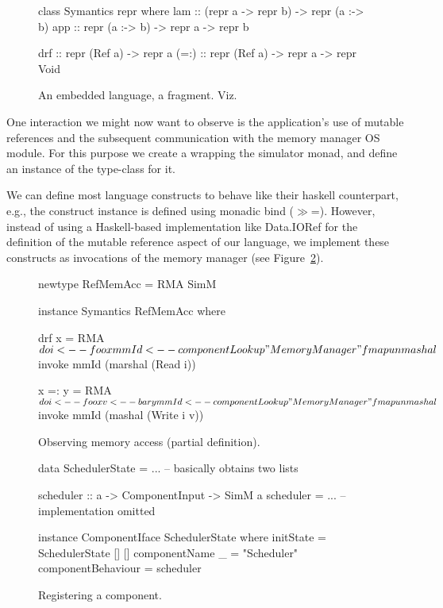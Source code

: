 \begin{figure}
\centering
\begin{code}
class Symantics repr where
  lam   :: (repr a -> repr b) -> repr (a :-> b)
  app   :: repr (a :-> b) -> repr a -> repr b

  drf   :: repr (Ref a) -> repr a
  (=:)  :: repr (Ref a) -> repr a -> repr Void
\end{code}
\caption{An embedded language, a fragment. Viz.~\cite{final_tagless_embedding}}
\label{fig:embedded_language_interface}
\end{figure}

One interaction we might now want to observe is the application's use of mutable references and the subsequent communication with the memory manager OS module.
For this purpose we create a  wrapping the simulator monad, and define an instance of the  type-class for it.

We can define most language constructs to behave like their haskell counterpart, e.g., the  construct instance is defined using monadic bind (\textsf{$\gg$=}).
However, instead of using a Haskell-based implementation like \textsf{Data.IORef} for the definition of the mutable reference aspect of our language, we implement these constructs as invocations of the memory manager (see Figure~\ref{lst_observing_memory_access}).

\begin{figure}
\centering
\begin{code}
newtype RefMemAcc =  RMA SimM

instance Symantics RefMemAcc where

  drf x = RMA $ do
    i     <-- foo x
    mmId  <-- componentLookup "MemoryManager"
    fmap unmashal $ invoke mmId (marshal (Read i))

  x =: y = RMA $ do
    i     <-- foo x
    v     <-- bar y
    mmId  <-- componentLookup "MemoryManager"
    fmap unmashal $ invoke mmId (mashal (Write i v))
\end{code}
\caption{Observing memory access (partial definition).}
\label{lst_observing_memory_access}
\end{figure}


\begin{figure}
\centering
\begin{code}
data SchedulerState = ... -- basically obtains two lists

scheduler :: a -> ComponentInput -> SimM a
scheduler = ... -- implementation omitted

instance ComponentIface  SchedulerState where
  initState           =  SchedulerState [] []
  componentName _     =  "Scheduler"
  componentBehaviour  =  scheduler
\end{code}
\caption{Registering a  component.}
\label{fig:code-scheduler}
\end{figure}

